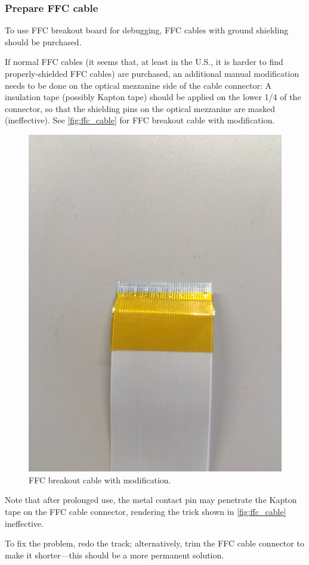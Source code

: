 \subsubsection{Prepare FFC cable}
To use FFC breakout board for debugging, FFC cables with ground shielding should
be purchased.

If normal FFC cables (it seems that, at least in the U.S., it is harder to find
properly-shielded FFC cables) are purchased, an additional manual modification
needs to be done on the optical mezzanine side of the cable connector:
A insulation tape (possibly Kapton tape) should be applied on the lower 1/4 of
the connector, so that the shielding pins on the optical mezzanine are masked
(ineffective).
See \autoref{fig:ffc_cable} for FFC breakout cable with modification.

\begin{figure}[!ht]
\centering
\includegraphics[width=0.9\linewidth]{res/ffc_breakout_cable_with_tape.jpg}
\caption{FFC breakout cable with modification.}
\label{fig:ffc_cable}
\end{figure}

\begin{leftbar}
    Note that after prolonged use, the metal contact pin may penetrate the
    Kapton tape on the FFC cable connector, rendering the trick shown in
    \autoref{fig:ffc_cable} ineffective.

    To fix the problem, redo the track;
    alternatively, trim the FFC cable connector to make it shorter---this should
    be a more permanent solution.
\end{leftbar}
